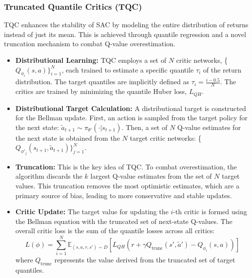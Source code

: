 \subsubsection{Truncated Quantile Critics (TQC)}
TQC enhances the stability of SAC by modeling the entire distribution of returns instead of just its mean. This is achieved through quantile regression and a novel truncation mechanism to combat Q-value overestimation.

\begin{itemize}
    \item \textbf{Distributional Learning:} TQC employs a set of $N$ critic networks, \{$Q_{\phi_i}(s, a)\}_{i=1}^{N}$, each trained to estimate a specific quantile $\tau_i$ of the return distribution. The target quantiles are implicitly defined as $\tau_i = \frac{i-0.5}{N}$. The critics are trained by minimizing the quantile Huber loss, $L_{QH}$.
    
    \item \textbf{Distributional Target Calculation:} A distributional target is constructed for the Bellman update. First, an action is sampled from the target policy for the next state: $\tilde{a}_{t+1} \sim \pi_{\theta'}(\cdot|s_{t+1})$. Then, a set of $N$ Q-value estimates for the next state is obtained from the $N$ target critic networks: \{$Q_{\phi'_j}(s_{t+1}, \tilde{a}_{t+1})\}_{j=1}^{N}$.
    
    \item \textbf{Truncation:} This is the key idea of TQC. To combat overestimation, the algorithm discards the $k$ largest Q-value estimates from the set of $N$ target values. This truncation removes the most optimistic estimates, which are a primary source of bias, leading to more conservative and stable updates.
    
    \item \textbf{Critic Update:} The target value for updating the $i$-th critic is formed using the Bellman equation with the truncated set of next-state Q-values. The overall critic loss is the sum of the quantile losses across all critics:
    \[
    L(\phi) = \sum_{i=1}^{N} \mathbb{E}_{(s,a,r,s') \sim D} \left[ L_{QH}\left(r + \gamma Q_{\text{trunc}}(s', \tilde{a}') - Q_{\phi_i}(s,a) \right) \right]
    \]
    where $Q_{\text{trunc}}$ represents the value derived from the truncated set of target quantiles.
\end{itemize}







